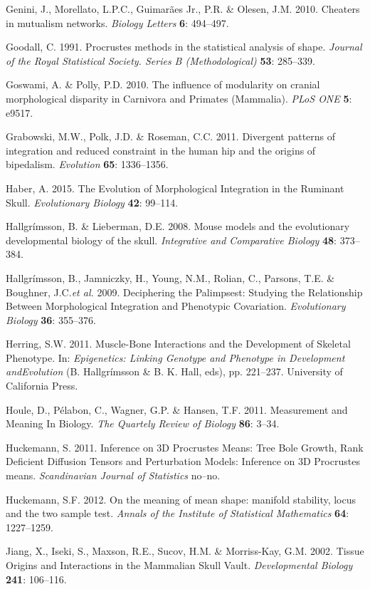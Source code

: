 \documentclass[12pt,]{article}
\begin{document}
Genini, J., Morellato, L.P.C., Guimarães Jr., P.R. \& Olesen, J.M. 2010.
Cheaters in mutualism networks. \emph{Biology Letters} \textbf{6}:
494--497.

Goodall, C. 1991. Procrustes methods in the statistical analysis of
shape. \emph{Journal of the Royal Statistical Society. Series B
(Methodological)} \textbf{53}: 285--339.

Goswami, A. \& Polly, P.D. 2010. The influence of modularity on cranial
morphological disparity in Carnivora and Primates (Mammalia). \emph{PLoS
ONE} \textbf{5}: e9517.

Grabowski, M.W., Polk, J.D. \& Roseman, C.C. 2011. Divergent patterns of
integration and reduced constraint in the human hip and the origins of
bipedalism. \emph{Evolution} \textbf{65}: 1336--1356.

Haber, A. 2015. The Evolution of Morphological Integration in the
Ruminant Skull. \emph{Evolutionary Biology} \textbf{42}: 99--114.

Hallgrímsson, B. \& Lieberman, D.E. 2008. Mouse models and the
evolutionary developmental biology of the skull. \emph{Integrative and
Comparative Biology} \textbf{48}: 373--384.

Hallgrímsson, B., Jamniczky, H., Young, N.M., Rolian, C., Parsons, T.E.
\& Boughner, J.C.\emph{et al.} 2009. Deciphering the Palimpsest:
Studying the Relationship Between Morphological Integration and
Phenotypic Covariation. \emph{Evolutionary Biology} \textbf{36}:
355--376.

Herring, S.W. 2011. Muscle-Bone Interactions and the Development of
Skeletal Phenotype. In: \emph{Epigenetics: Linking Genotype and
Phenotype in Development andEvolution} (B. Hallgrímsson \& B. K. Hall,
eds), pp. 221--237. University of California Press.

Houle, D., Pélabon, C., Wagner, G.P. \& Hansen, T.F. 2011. Measurement
and Meaning In Biology. \emph{The Quartely Review of Biology}
\textbf{86}: 3--34.

Huckemann, S. 2011. Inference on 3D Procrustes Means: Tree Bole Growth,
Rank Deficient Diffusion Tensors and Perturbation Models: Inference on
3D Procrustes means. \emph{Scandinavian Journal of Statistics} no--no.

Huckemann, S.F. 2012. On the meaning of mean shape: manifold stability,
locus and the two sample test. \emph{Annals of the Institute of
Statistical Mathematics} \textbf{64}: 1227--1259.

Jiang, X., Iseki, S., Maxson, R.E., Sucov, H.M. \& Morriss-Kay, G.M.
2002. Tissue Origins and Interactions in the Mammalian Skull Vault.
\emph{Developmental Biology} \textbf{241}: 106--116.
\end{document}
